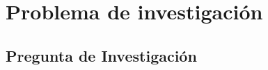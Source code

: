 \chapter{Problema de investigación}
\label{Problemática}



\section{Pregunta de Investigación}






